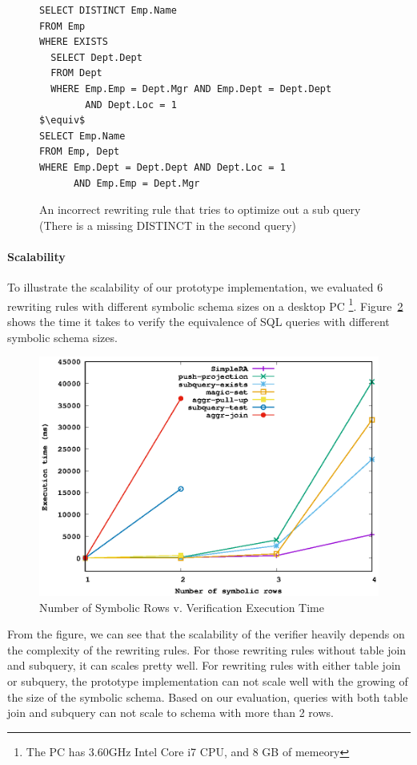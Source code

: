 \begin{figure}[!htb]
\begin{lstlisting}[style=sql,xleftmargin=.2\textwidth,mathescape=true]
SELECT DISTINCT Emp.Name
FROM Emp
WHERE EXISTS 
  SELECT Dept.Dept
  FROM Dept
  WHERE Emp.Emp = Dept.Mgr AND Emp.Dept = Dept.Dept
        AND Dept.Loc = 1
$\equiv$
SELECT Emp.Name
FROM Emp, Dept
WHERE Emp.Dept = Dept.Dept AND Dept.Loc = 1 
      AND Emp.Emp = Dept.Mgr
\end{lstlisting}
\caption{An incorrect rewriting rule that tries to optimize out a sub query
  (There is a missing DISTINCT in the second query)}
\label{fig:push-proj}
\end{figure}

\paragraph{Scalability}
To illustrate the scalability of our prototype implementation, we evaluated
6 rewriting rules with different symbolic schema sizes on a desktop PC
\footnote{The PC has 3.60GHz Intel Core i7 CPU, and 8 GB of memeory}.
Figure~\ref{fig:scale} shows the time it takes to verify the equivalence of SQL queries
with different symbolic schema sizes.

\begin{figure}[ht]
  \centering
  \includegraphics[width=0.7\linewidth]{scale.eps}
  \caption{Number of Symbolic Rows v. Verification Execution Time}
  \label{fig:scale}
\end{figure}

From the figure, we can see that the scalability of the verifier heavily depends 
on the complexity of the rewriting rules.
For those rewriting rules without table join and subquery, it can scales pretty well.
For rewriting rules with either table join or subquery, the prototype implementation can 
not scale well with the growing of the size of the symbolic schema.
Based on our evaluation, queries with both table join and subquery can not scale to schema with
more than 2 rows.

